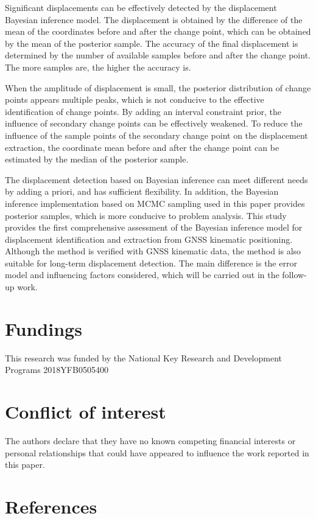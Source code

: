 \documentclass[final,3p,times]{elsarticle}
\begin{document}
	Significant displacements can be effectively detected by the displacement Bayesian inference model.
	The displacement is obtained by the difference of the mean of the coordinates before and after the change point, which can be obtained by the mean of the posterior sample.
	The accuracy of the final displacement is determined by the number of available samples before and after the change point.
	The more samples are, the higher the accuracy is.
	
	When the amplitude of displacement is small, the posterior distribution of change points appears multiple peaks, which is not conducive to the effective identification of change points.
	By adding an interval constraint prior, the influence of secondary change points can be effectively weakened.
	To reduce the influence of the sample points of the secondary change point on the displacement extraction, the coordinate mean before and after the change point can be estimated by the median of the posterior sample.
	
	The displacement detection based on Bayesian inference can meet different needs by adding a priori, and has sufficient flexibility.
	In addition, the Bayesian inference implementation based on MCMC sampling used in this paper provides posterior samples, which is more conducive to problem analysis.
	This study provides the first comprehensive assessment of the Bayesian inference model for displacement identification and extraction from GNSS kinematic positioning.
	\textcolor{r_s}{
	Although the method is verified with GNSS kinematic data, the method is also suitable for long-term displacement detection. The main difference is the error model and influencing factors considered, which will be carried out in the follow-up work.	
	}
	

	\section*{Fundings}
This research was funded by the National Key Research and Development Programs 2018YFB0505400
	\section*{Conflict of interest}
	The authors declare that they have no known competing financial interests or personal relationships that could have appeared to influence the work reported in this paper.
	\section*{References} 
	
	
\end{document}
